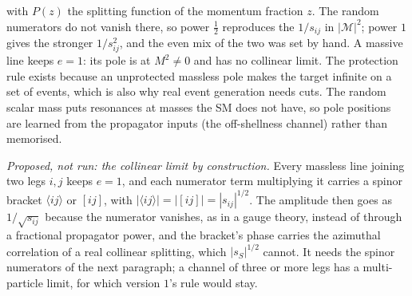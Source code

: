 \documentclass[11pt]{article}
\begin{document}
with $P(z)$ the splitting function of the momentum fraction $z$. The random numerators do not vanish there, so power
$\tfrac12$ reproduces the $1/s_{ij}$ in $|\mathcal M|^2$; power $1$ gives the stronger $1/s_{ij}^2$, and the even mix
of the two was set by hand. A massive line keeps $e=1$: its pole is at $M^2\ne0$ and has no collinear limit. The
protection rule exists because an unprotected massless pole makes the target infinite on a set of events, which is also
why real event generation needs cuts. The random scalar mass puts resonances at masses the SM does not have, so pole
positions are learned from the propagator inputs (the off-shellness channel) rather than memorised.
\par\smallskip\noindent \emph{Proposed, not run: the collinear limit by construction.} Every massless line joining two legs $i,j$ keeps $e=1$,
and each numerator term multiplying it carries a spinor bracket $\langle ij\rangle$ or $[ij]$, with
$|\langle ij\rangle|=|[ij]|=|s_{ij}|^{1/2}$. The amplitude then goes as $1/\sqrt{s_{ij}}$ because the numerator vanishes,
as in a gauge theory, instead of through a fractional propagator power, and the bracket's phase carries the azimuthal
correlation of a real collinear splitting, which $|s_S|^{1/2}$ cannot. It needs the spinor numerators of the next
paragraph; a channel of three or more legs has a multi-particle limit, for which version $1$'s rule would stay.
\end{document}
